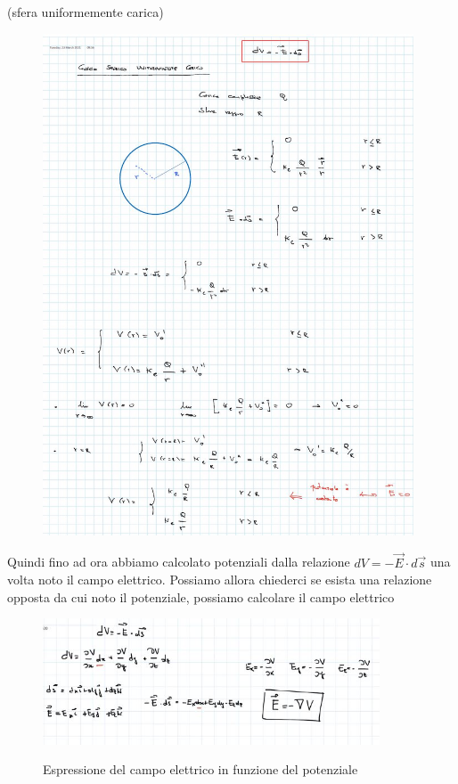 \clearpage
\begin{esempio}(sfera uniformemente carica)
	\begin{figure}[h]
	\begin{center}
		\includegraphics[width=11cm]{lezione8/images/9 Elettrostatica, Il potenziale elettrico}\\
		\caption{}
	\end{center}
\end{figure}
	
\end{esempio}
\clearpage
Quindi fino ad ora abbiamo calcolato potenziali dalla relazione $dV=-\vec{E}\cdot d\vec{s}$ una volta noto il campo elettrico. Possiamo allora chiederci se esista una relazione opposta da cui noto il potenziale, possiamo calcolare il campo elettrico

	\begin{figure}[h]
	\begin{center}
		\includegraphics[width=10cm]{lezione8/images/12 Elettrostatica, Il potenziale elettrico}\\
		\caption{Espressione del campo elettrico in funzione del potenziale}
	\end{center}
\end{figure}


